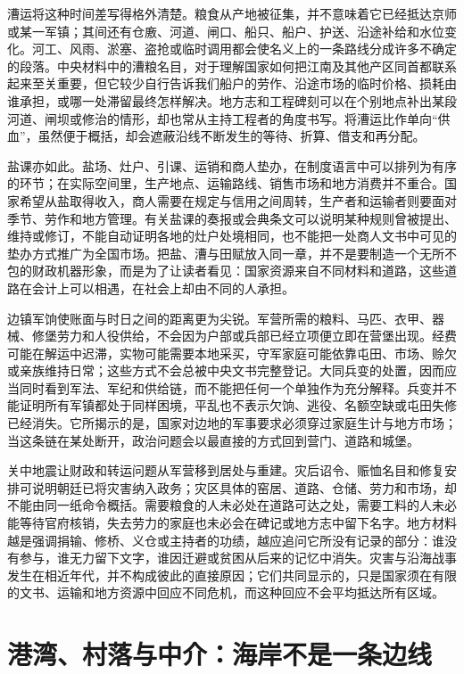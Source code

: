 漕运将这种时间差写得格外清楚。粮食从产地被征集，并不意味着它已经抵达京师或某一军镇；其间还有仓廒、河道、闸口、船只、船户、护送、沿途补给和水位变化。河工、风雨、淤塞、盗抢或临时调用都会使名义上的一条路线分成许多不确定的段落。中央材料中的漕粮名目，对于理解国家如何把江南及其他产区同首都联系起来至关重要，但它较少自行告诉我们船户的劳作、沿途市场的临时价格、损耗由谁承担，或哪一处滞留最终怎样解决。地方志和工程碑刻可以在个别地点补出某段河道、闸坝或修治的情形，却也常从主持工程者的角度书写。将漕运比作单向“供血”，虽然便于概括，却会遮蔽沿线不断发生的等待、折算、借支和再分配。

盐课亦如此。盐场、灶户、引课、运销和商人垫办，在制度语言中可以排列为有序的环节；在实际空间里，生产地点、运输路线、销售市场和地方消费并不重合。国家希望从盐取得收入，商人需要在规定与信用之间周转，生产者和运输者则要面对季节、劳作和地方管理。有关盐课的奏报或会典条文可以说明某种规则曾被提出、维持或修订，不能自动证明各地的灶户处境相同，也不能把一处商人文书中可见的垫办方式推广为全国市场。把盐、漕与田赋放入同一章，并不是要制造一个无所不包的财政机器形象，而是为了让读者看见：国家资源来自不同材料和道路，这些道路在会计上可以相遇，在社会上却由不同的人承担。

边镇军饷使账面与时日之间的距离更为尖锐。军营所需的粮料、马匹、衣甲、器械、修堡劳力和人役供给，不会因为户部或兵部已经立项便立即在营堡出现。经费可能在解运中迟滞，实物可能需要本地采买，守军家庭可能依靠屯田、市场、赊欠或亲族维持日常；这些方式不会总被中央文书完整登记。大同兵变的处置，因而应当同时看到军法、军纪和供给链，而不能把任何一个单独作为充分解释。兵变并不能证明所有军镇都处于同样困境，平乱也不表示欠饷、逃役、名额空缺或屯田失修已经消失。它所揭示的是，国家对边地的军事要求必须穿过家庭生计与地方市场；当这条链在某处断开，政治问题会以最直接的方式回到营门、道路和城堡。

关中地震让财政和转运问题从军营移到居处与重建。灾后诏令、赈恤名目和修复安排可说明朝廷已将灾害纳入政务；灾区具体的窑居、道路、仓储、劳力和市场，却不能由同一纸命令概括。需要粮食的人未必处在道路可达之处，需要工料的人未必能等待官府核销，失去劳力的家庭也未必会在碑记或地方志中留下名字。地方材料越是强调捐输、修桥、义仓或主持者的功绩，越应追问它所没有记录的部分：谁没有参与，谁无力留下文字，谁因迁避或贫困从后来的记忆中消失。灾害与沿海战事发生在相近年代，并不构成彼此的直接原因；它们共同显示的，只是国家须在有限的文书、运输和地方资源中回应不同危机，而这种回应不会平均抵达所有区域。

\section{港湾、村落与中介：海岸不是一条边线}

